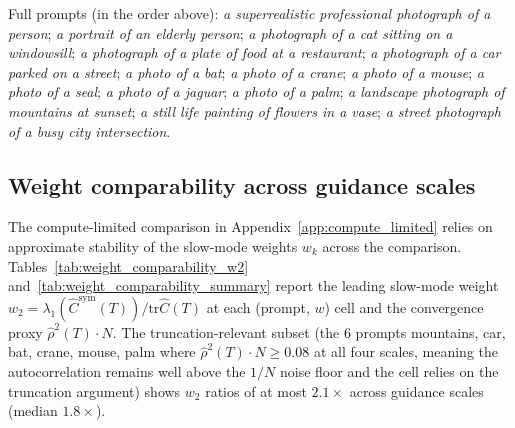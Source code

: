 \documentclass{article}
\newcommand{\tr}{\mathrm{tr}}
\begin{document}
Full prompts (in the order above): \emph{a superrealistic professional
photograph of a person}; \emph{a portrait of an elderly person};
\emph{a photograph of a cat sitting on a windowsill}; \emph{a
photograph of a plate of food at a restaurant}; \emph{a photograph of
a car parked on a street}; \emph{a photo of a bat}; \emph{a photo of
a crane}; \emph{a photo of a mouse}; \emph{a photo of a seal};
\emph{a photo of a jaguar}; \emph{a photo of a palm}; \emph{a
landscape photograph of mountains at sunset}; \emph{a still life
painting of flowers in a vase}; \emph{a street photograph of a busy
city intersection}.

\subsection{Weight comparability across guidance scales}
\label{app:sdxl_weight_comparability}

The compute-limited comparison in Appendix~\ref{app:compute_limited} relies on approximate stability of the slow-mode weights $w_k$ across the comparison. Tables~\ref{tab:weight_comparability_w2} and~\ref{tab:weight_comparability_summary} report the leading slow-mode weight $w_2 = \lambda_1(\hat C^{\mathrm{sym}}(T))/\tr\hat C(T)$ at each (prompt, $w$) cell and the convergence proxy $\hat\rho^2(T)\cdot N$. The truncation-relevant subset (the 6 prompts mountains, car, bat, crane, mouse, palm where $\hat\rho^2(T)\cdot N \geq 0.08$ at all four scales, meaning the autocorrelation remains well above the $1/N$ noise floor and the cell relies on the truncation argument) shows $w_2$ ratios of at most $2.1\times$ across guidance scales (median $1.8\times$).
\clearpage
\end{document}
